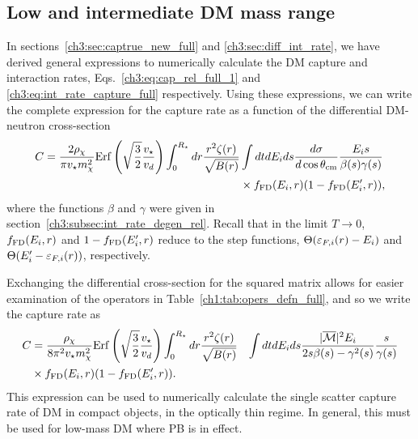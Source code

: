 \subsection{Low and intermediate DM mass range}
\label{ch3:subsec:captureintermediate}


In sections~\ref{ch3:sec:captrue_new_full} and \ref{ch3:sec:diff_int_rate}, we have derived general expressions to numerically calculate the DM capture and interaction rates,  
Eqs.~\ref{ch3:eq:cap_rel_full_1} and \ref{ch3:eq:int_rate_capture_full} respectively.   
Using these expressions, we can write 
the complete expression for the capture rate as a function of the differential DM-neutron cross-section 
\begin{equation}
    \begin{split}
        C = \frac{2\rho_\chi}{\pi v_\star m_\chi^2} {\rm Erf}\left(\sqrt{\frac{3}{2}}\frac{v_\star}{v_d}\right)\int_0^{R_\star}  dr  \frac{r^2\zeta(r)}{\sqrt{B(r)}} &\int dt dE_i ds \frac{d\sigma}{d\cos\theta_\mathrm{cm}}\frac{E_i s}{\beta(s)\gamma(s)}\\
        &\times f_{\rm FD}(E_i,r)(1-f_{\rm FD}(E_i',r)), 
    \end{split}
\label{ch3:eq:capturefinal}
\end{equation}
where the functions $\beta$ and $\gamma$ were given in section~\ref{ch3:subsec:int_rate_degen_rel}. Recall that in the limit $T\rightarrow0$,  $f_{\rm FD}(E_i,r)$ and $1-f_{\rm FD}(E_i',r)$  reduce to the step functions,  $\Theta(\varepsilon_{F,i}(r)-E_i)$ and  $\Theta(E_i'-\varepsilon_{F,i}(r))$, respectively. 


Exchanging the differential cross-section for the squared matrix allows for easier examination of the operators in Table~\ref{ch1:tab:opers_defn_full}, and so we write the capture rate as
\begin{equation}
    \begin{split}
        C &=  \frac{\rho_\chi}{8\pi^2 v_\star m_\chi^2} {\rm Erf}\left(\sqrt{\frac{3}{2}}\frac{v_\star}{v_d}\right)\int_0^{R_\star}   dr  \frac{r^2 \zeta(r) }{\sqrt{B(r)}} & \int dt dE_i ds \frac{|\overline{\mathcal M}|^2 E_i}{2s\beta(s)-\gamma^2(s)} \frac{s}{\gamma(s)} \\
        &\times f_{\rm FD}(E_i,r)(1-f_{\rm FD}(E_i',r)). 
    \end{split}
    \label{ch3:eq:capturefinalM2}
\end{equation}
This expression can be used to numerically calculate the single scatter capture rate of DM in compact objects, in the optically thin regime. In general, this must be used for low-mass DM where PB is in effect.

